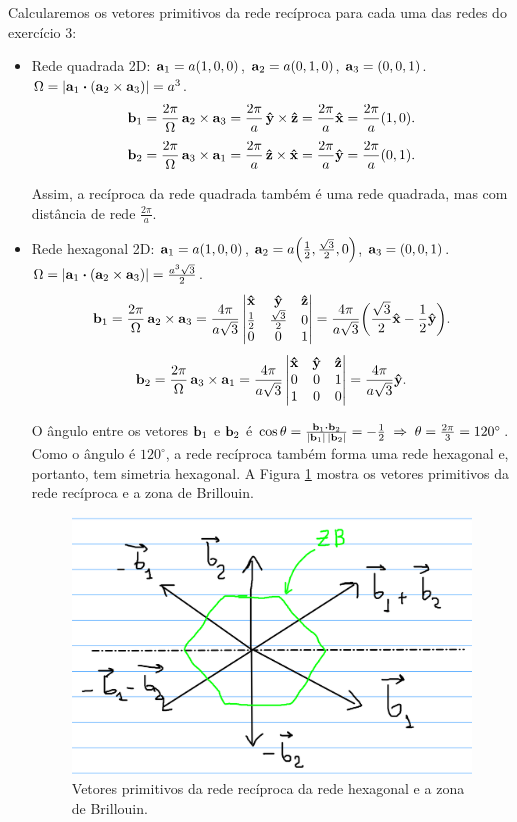 \documentclass[a4paper,10pt]{article}
\begin{document}
Calcularemos os vetores primitivos da rede recíproca para cada uma das redes do exercício 3:
\begin{itemize}
\item Rede quadrada 2D: $\vb{a}_1 = a(1,0,0)$, $\vb{a}_2 = a(0,1,0)$, $\vb{a}_3 = (0,0,1)$. $\Omega = \abs{\a_1 \vdot (\a_2 \times \a_3)} = a^3$.
$$
\vb{b}_1 = \frac{2\pi}{\Omega} \, \vb{a}_2 \times \vb{a}_3 = \frac{2\pi}{a} \, \vu{y} \times \vu{z} = \frac{2\pi}{a} \vu{x} = \frac{2\pi}{a} (1, 0).
$$
$$
\vb{b}_2 = \frac{2\pi}{\Omega} \, \vb{a}_3 \times \vb{a}_1 = \frac{2\pi}{a} \, \vu{z} \times \vu{x} = \frac{2\pi}{a} \vu{y} = \frac{2\pi}{a} (0, 1).
$$

Assim, a recíproca da rede quadrada também é uma rede quadrada, mas com distância de rede $\frac{2\pi}{a}$.

\item Rede hexagonal 2D: $\vb{a}_1 = a(1,0,0)$, $\vb{a}_2 = a\qty(\frac{1}{2},\frac{\sqrt{3}}{2},0)$, $\vb{a}_3 = (0,0,1)$. $\Omega = \abs{\a_1 \vdot (\a_2 \times \a_3)} = \frac{a^3 \sqrt{3}}{2}$.
$$
\vb{b}_1 = \frac{2\pi}{\Omega} \, \vb{a}_2 \times \vb{a}_3 =
\frac{4\pi}{a \sqrt{3}}
\begin{vmatrix}
\vu{x} & \vu{y} & \vu{z} \\
\frac{1}{2} & \frac{\sqrt{3}}{2} & 0 \\
0 & 0 & 1 \\
\end{vmatrix}
=
\frac{4\pi}{a \sqrt{3}} \qty(\frac{\sqrt{3}}{2} \vu{x} - \frac{1}{2} \vu{y}).
$$
$$
\vb{b}_2 = \frac{2\pi}{\Omega} \, \vb{a}_3 \times \vb{a}_1 =
\frac{4\pi}{a \sqrt{3}}
\begin{vmatrix}
\vu{x} & \vu{y} & \vu{z} \\
0 & 0 & 1 \\
1 & 0 & 0 \\
\end{vmatrix}
= \frac{4\pi}{a\sqrt{3}} \vu{y}.
$$

O ângulo entre os vetores $\vb{b}_1$ e $\vb{b}_2$ é $\cos\theta = \frac{\b_1 \vdot \b_2}{\abs{\b_1}\,\abs{\b_2}} = -\frac{1}{2} \implies \theta = \frac{2\pi}{3} = 120^\circ$. Como o ângulo é $120^\circ$, a rede recíproca também forma uma rede hexagonal e, portanto, tem simetria hexagonal. A Figura \ref{fig:hex_bz} mostra os vetores primitivos da rede recíproca e a zona de Brillouin.

\begin{figure}[H]
\centering
\includegraphics[width=0.7\linewidth]{fig/hex_bz}
\caption{Vetores primitivos da rede recíproca da rede hexagonal e a zona de Brillouin.}
\label{fig:hex_bz}
\end{figure}


\end{itemize}
\end{document}
